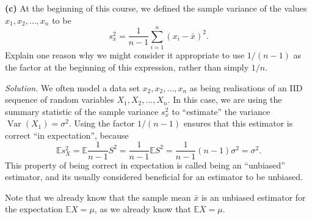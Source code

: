 \documentclass[
  a4paper,
]{book}
\theoremstyle{definition}
\theoremstyle{definition}
\theoremstyle{definition}
\theoremstyle{definition}
\theoremstyle{remark}
\begin{document}
\textbf{(c)} At the beginning of this course, we defined the sample variance of the values \(x_1, x_2, \dots, x_n\) to be
\[ s^2_x = \frac{1}{n-1} \sum_{i=1}^n (x_i - \bar x)^2 . \]
Explain one reason why we might consider it appropriate to use \(1/(n-1)\) as the factor at the beginning of this expression, rather than simply \(1/n\).

\begin{myanswers}
\emph{Solution.}
We often model a data set \(x_2, x_2, \dots, x_n\) as being realisations of an IID sequence of random variables \(X_1, X_2, \dots, X_n\). In this case, we are using the summary statistic of the sample variance \(s_x^2\) to ``estimate'' the variance \(\operatorname{Var}(X_1) = \sigma^2\). Using the factor \(1/(n-1)\) ensures that this estimator is correct ``in expectation'', because
\[ \mathbb E s_X^2 = \mathbb E \frac{1}{n-1}S^2 = \frac{1}{n-1} \mathbb ES^2 = \frac{1}{n-1}(n-1)\sigma^2 = \sigma^2 . \]
This property of being correct in expectation is called being an ``unbiased'' estimator, and its usually considered beneficial for an estimator to be unbiased.

Note that we already know that the sample mean \(\bar x\) is an unbiased estimator for the expectation \(\mathbb EX = \mu\), as we already know that \(\mathbb E\overline X = \mu\).

\end{myanswers}
\end{document}
